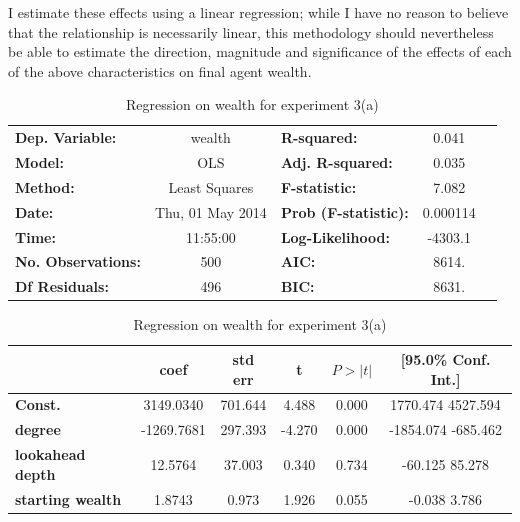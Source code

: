 \documentclass{article}
\begin{document}
I estimate these effects using a linear regression; while I have no reason to believe that the relationship is necessarily linear, this methodology should nevertheless be able to estimate the direction, magnitude and significance of the effects of each of the above characteristics on final agent wealth. 

\begin{table}
\begin{tabular}{lclcl}
\toprule
\textbf{Dep. Variable:}    &      wealth      & \textbf{  R-squared:         } &     0.041   \\
\textbf{Model:}            &       OLS        & \textbf{  Adj. R-squared:    } &     0.035   \\
\textbf{Method:}           &  Least Squares   & \textbf{  F-statistic:       } &     7.082   \\
\textbf{Date:}             & Thu, 01 May 2014 & \textbf{  Prob (F-statistic):} &  0.000114   \\
\textbf{Time:}             &     11:55:00     & \textbf{  Log-Likelihood:    } &   -4303.1   \\
\textbf{No. Observations:} &         500      & \textbf{  AIC:               } &     8614.   \\
\textbf{Df Residuals:}     &         496      & \textbf{  BIC:               } &     8631.   \\
\bottomrule
\end{tabular}

\begin{tabular}{lccccc}
\toprule
                         & \textbf{coef} & \textbf{std err} & \textbf{t} & \textbf{$P>|t|$} & \textbf{[95.0\% Conf. Int.]}  \\
\midrule
\textbf{Const.}          &    3149.0340  &      701.644     &     4.488  &      0.000     &      1770.474  4527.594      \\
\textbf{degree}          &   -1269.7681  &      297.393     &    -4.270  &      0.000     &     -1854.074  -685.462      \\
\textbf{lookahead depth}       &      12.5764  &       37.003     &     0.340  &      0.734     &       -60.125    85.278      \\
\textbf{starting wealth} &       1.8743  &        0.973     &     1.926  &      0.055     &        -0.038     3.786      \\
\bottomrule
\end{tabular}
\caption{Regression on wealth for experiment 3(a)}
\end{table}
\end{document}
